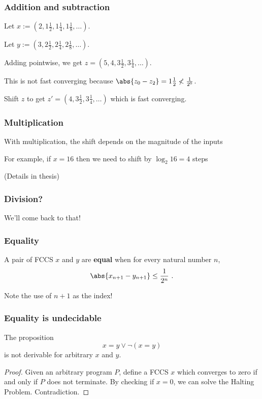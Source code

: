 \documentclass{beamer}
\begin{document}
\begin{frame}
    \frametitle{Addition and subtraction}

    \begin{Example}
        Let $x := (2, 1\frac 1 2, 1\frac 1 4, 1\frac 1 8, \dots)$.

        Let $y := (3, 2\frac 1 2, 2\frac 1 4, 2\frac 1 8, \dots)$.

        Adding pointwise, we get $z = (5, 4, 3\frac 1 2, 3\frac 1 4, \dots)$.

        This is not fast converging because
        $\abs{z_0 - z_2} = 1\frac 1 2 \nless \frac 1 {2^0}$.

        Shift $z$ to get $z' = (4, 3\frac 1 2, 3\frac 1 4, \dots)$ which is fast converging.
    \end{Example}
\end{frame}

\begin{frame}
    \frametitle{Multiplication}
    With multiplication, the shift depends on the magnitude of the inputs

    For example, if $x = 16$ then we need to shift by $\log_2 16 = 4$ steps

    (Details in thesis)
\end{frame}

\begin{frame}
    \frametitle{Division?}
    We'll come back to that!
\end{frame}

\begin{frame}
    \frametitle{Equality}

    \begin{Definition}
        A pair of FCCS $x$ and $y$ are \textbf{equal} when for every natural number $n$,
        \[ \abs{x_{n+1} - y_{n+1}} \leq \frac 1 {2^n} \ . \]
    \end{Definition}

    Note the use of $n+1$ as the index!
\end{frame}

\begin{frame}
    \frametitle{Equality is undecidable}
    \begin{Theorem}
        The proposition
        \[ x = y \vee \neg (x = y) \]
        is not derivable for arbitrary $x$ and $y$.
    \end{Theorem}
    \begin{proof}
        Given an arbitrary program $P$, define a FCCS $x$ which converges to zero if and only if $P$ does not terminate. By checking if $x = 0$, we can solve the Halting Problem. Contradiction.
    \end{proof}
\end{frame}
\end{document}
